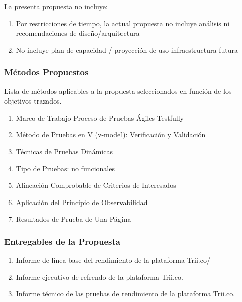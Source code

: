 \documentclass[
  paper=a4,
  ,captions=tableheading
]{scrartcl}
\providecommand{\tightlist}{%
  \setlength{\itemsep}{0pt}\setlength{\parskip}{0pt}}
\begin{document}
La presenta propuesta no incluye:

\begin{enumerate}
\def\labelenumi{\arabic{enumi}.}
\tightlist
\item
  Por restricciones de tiempo, la actual propuesta no incluye análisis
  ni recomendaciones de diseño/arquitectura
\item
  No incluye plan de capacidad / proyección de uso infraestructura
  futura
\end{enumerate}

\subsubsection{Métodos Propuestos}\label{sec:muxe9todos-propuestos}

Lista de métodos aplicables a la propuesta seleccionados en función de
los objetivos trazados.

\begin{enumerate}
\def\labelenumi{\arabic{enumi}.}
\tightlist
\item
  Marco de Trabajo Proceso de Pruebas Ágiles Testfully
\item
  Método de Pruebas en V (v-model): Verificación y Validación
\item
  Técnicas de Pruebas Dinámicas
\item
  Tipo de Pruebas: no funcionales
\item
  Alineación Comprobable de Criterios de Interesados
\item
  Aplicación del Principio de Observabilidad
\item
  Resultados de Prueba de Una-Página
\end{enumerate}

\subsubsection{Entregables de la
Propuesta}\label{sec:entregables-de-la-propuesta}

\begin{enumerate}
\def\labelenumi{\arabic{enumi}.}
\tightlist
\item
  Informe de línea base del rendimiento de la plataforma Trii.co/
\item
  Informe ejecutivo de refrendo de la plataforma Trii.co.
\item
  Informe técnico de las pruebas de rendimiento de la plataforma
  Trii.co.
\end{enumerate}
\end{document}
